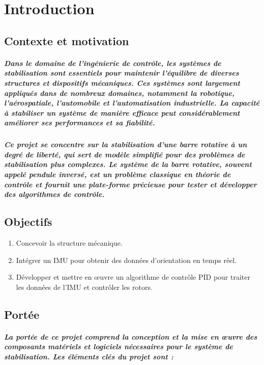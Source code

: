 \chapter{Introduction}
\label{cp:introduction}


\section{Contexte et motivation}
\paragraph{Dans le domaine de l'ingénierie de contrôle, les systèmes de stabilisation sont essentiels pour maintenir l'équilibre de diverses structures et dispositifs mécaniques. Ces systèmes sont largement appliqués dans de nombreux domaines, notamment la robotique, l'aérospatiale, l'automobile et l'automatisation industrielle. La capacité à stabiliser un système de manière efficace peut considérablement améliorer ses performances et sa fiabilité.}
\paragraph{Ce projet se concentre sur la stabilisation d'une barre rotative à un degré de liberté, qui sert de modèle simplifié pour des problèmes de stabilisation plus complexes. Le système de la barre rotative, souvent appelé pendule inversé, est un problème classique en théorie de contrôle et fournit une plate-forme précieuse pour tester et développer des algorithmes de contrôle.}

\section{Objectifs}
\begin{enumerate}
	\item Concevoir la structure mécanique.
	\item Intégrer un IMU pour obtenir des données d'orientation en temps réel.
	\item Développer et mettre en œuvre un algorithme de contrôle PID pour traiter les données de l'IMU et contrôler les rotors.
\end{enumerate}

\section{Portée}

\paragraph{La portée de ce projet comprend la conception et la mise en œuvre des composants matériels et logiciels nécessaires pour le système de stabilisation. Les éléments clés du projet sont :}

